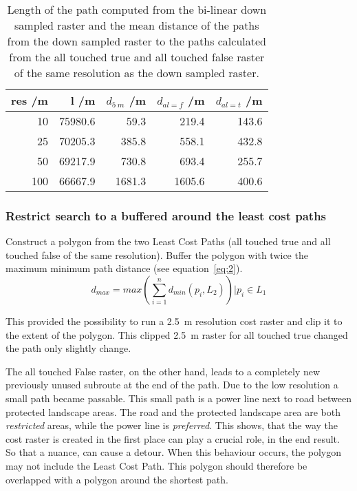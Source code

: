 \begin{table}[h!]
	\caption{Length of the path computed from the bi-linear down sampled raster and the mean distance of the paths from the down sampled raster to the paths calculated from the all touched true and all touched false raster of the same resolution as the down sampled raster.}
	\label{tab:5}
	\centering
	\begin{tabular}{ r  r  r  r  r}
		res /m & l /m  & $d_{5~m}$ /m &  $d_{al=f}$ /m & $d_{al=t}$ /m \\
		\hline
		
		10  & 75980.6 &    59.3 &  219.4 & 143.6\\
		25  & 70205.3 &   385.8 &  558.1 & 432.8\\
		50  & 69217.9 &   730.8 &  693.4 & 255.7\\
		100 & 66667.9 &  1681.3 & 1605.6 & 400.6\\
		
	\end{tabular}
\end{table}


\subsubsection{Restrict search to a buffered around the least cost paths}



Construct a polygon from the two Least Cost Paths (all touched true and all touched false of the same resolution).
Buffer the polygon with twice the maximum  minimum path distance  (see equation~\ref{eq:2}).
\begin{equation}
	\label{eq:2}
	d_{max} = max(\sum_{i=1}^{n} d_{min}(p_i, L_2)) \Bigr\vert p_i \in L_1
\end{equation}


This provided the possibility  to run a 2.5~m resolution cost raster and clip it to the extent of the polygon. 
This clipped 2.5~m raster for all touched true changed the path only slightly change. 

The all touched False raster, on the other hand, leads to a completely new previously unused subroute at the end of the path.
Due to the low resolution a small path became passable.
This small path is a power line next to road between protected landscape areas.
The road and the protected landscape area are both \textit{restricted} areas, while the power line is \textit{preferred}.
This shows, that the way the cost raster is created in the first place can play a crucial role, in the end result.
So that a nuance, can cause a detour.
When this behaviour occurs, the polygon may not include the Least Cost Path.
This polygon should therefore be overlapped with a polygon around the shortest path.


